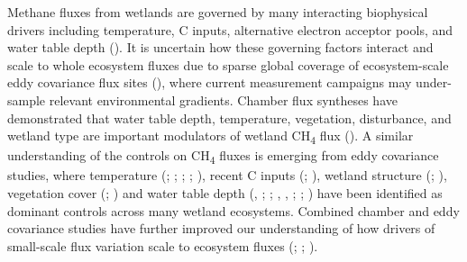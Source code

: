 \documentclass[
  12pt,
]{article}
\begin{document}
Methane fluxes from wetlands are governed by many interacting
biophysical drivers including temperature, C inputs, alternative
electron acceptor pools, and water table depth
(). It
is uncertain how these governing factors interact and scale to whole
ecosystem fluxes due to sparse global coverage of ecosystem-scale eddy
covariance flux sites (), where current measurement campaigns may
under-sample relevant environmental gradients. Chamber flux syntheses
have demonstrated that water table depth, temperature, vegetation,
disturbance, and wetland type are important modulators of wetland
CH\textsubscript{4} flux
().
A similar understanding of the controls on CH\textsubscript{4} fluxes is
emerging from eddy covariance studies, where temperature
(;
;
; ;
), recent C inputs
(;
),
wetland structure (; ), vegetation cover (;
) and water table depth (,
;
;
, ,
;
;
) have been identified as dominant controls across many wetland
ecosystems. Combined chamber and eddy covariance studies have further
improved our understanding of how drivers of small-scale flux variation
scale to ecosystem fluxes
(; ;
).
\end{document}

